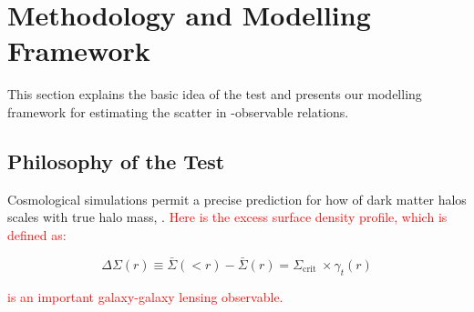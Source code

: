 \documentclass[fleqn,usenatbib,useAMS]{mnras}
\begin{document}
\section{Methodology and Modelling Framework}
    \label{sec:method}

    This section explains the basic idea of the \topn{} test and presents our modelling framework 
    for estimating the scatter in \mvir{}-observable relations.
    
\subsection{Philosophy of the \texorpdfstring{\topn{}}{TopN} Test}
    \label{sec:topn_intro}
    
    Cosmological simulations permit a precise prediction for how \dsigma{} of dark matter halos
    scales with true halo mass, \mvir{}.
    \textcolor{red}{Here \dsigma{} is the excess surface density profile, which is defined as:}
    
    \begin{equation}
        \Delta \Sigma(r) \equiv \bar{\Sigma}(<r)-\bar{\Sigma}(r)=\Sigma_{\text {crit }} \times \gamma_{t}(r)
    \end{equation}
    
    \noindent \textcolor{red}{\dsigma{} is an important galaxy-galaxy lensing observable.}
\end{document}
